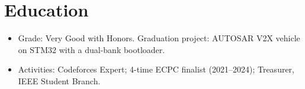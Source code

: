\documentclass[10pt]{article}
\begin{document}
\section*{Education}
\begin{itemize}
  \item Grade: Very Good with Honors. Graduation project: AUTOSAR V2X vehicle on STM32 with a dual-bank bootloader.
  \item Activities: Codeforces Expert; 4-time ECPC finalist (2021--2024); Treasurer, IEEE Student Branch.
\end{itemize}
\end{document}
